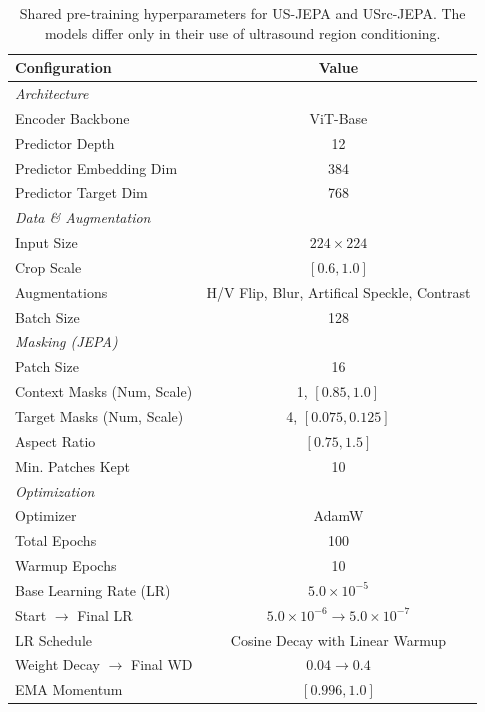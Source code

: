 \documentclass{article}
\theoremstyle{plain}
\theoremstyle{definition}
\theoremstyle{remark}
\begin{document}
\begin{table}[t]
  \caption{Shared pre-training hyperparameters for US-JEPA and USrc-JEPA. The models differ only in their use of ultrasound region conditioning.}
  \label{tab:pretraining_params}
  \begin{center}
    \begin{small}
      \begin{sc}
        \begin{tabular}{lc}
          \toprule
          \textbf{Configuration} & \textbf{Value} \\ 
          \midrule
          \textit{Architecture} & \\
          Encoder Backbone & ViT-Base \\
          Predictor Depth & 12 \\
          Predictor Embedding Dim & 384 \\
          Predictor Target Dim & 768 \\ 
          \midrule
          \textit{Data \& Augmentation} & \\
          Input Size & $224 \times 224$ \\
          Crop Scale & $[0.6, 1.0]$ \\
          Augmentations & H/V Flip, Blur, Artifical Speckle, Contrast \\
          Batch Size & 128 \\ 
          \midrule
          \textit{Masking (JEPA)} & \\
          Patch Size & 16 \\
          Context Masks (Num, Scale) & 1, $[0.85, 1.0]$ \\
          Target Masks (Num, Scale) & 4, $[0.075, 0.125]$ \\
          Aspect Ratio & $[0.75, 1.5]$ \\
          Min. Patches Kept & 10 \\ 
          \midrule
          \textit{Optimization} & \\
          Optimizer & AdamW \\
          Total Epochs & 100 \\
          Warmup Epochs & 10 \\
          Base Learning Rate (LR) & $5.0 \times 10^{-5}$ \\
          Start $\rightarrow$ Final LR & $5.0 \times 10^{-6} \rightarrow 5.0 \times 10^{-7}$ \\
          LR Schedule & Cosine Decay with Linear Warmup \\
          Weight Decay $\rightarrow$ Final WD & $0.04 \rightarrow 0.4$ \\
          EMA Momentum & $[0.996, 1.0]$ \\ 
          \bottomrule
        \end{tabular}
      \end{sc}
    \end{small}
  \end{center}
  \vskip -0.1in
\end{table}
\end{document}
